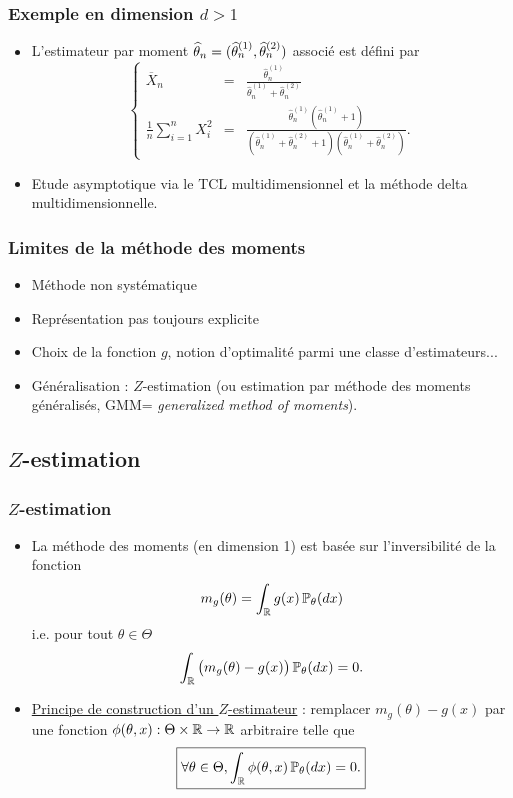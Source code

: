\begin{frame}
\frametitle{Exemple en dimension $d>1$}
\begin{itemize}
\item \alert{L'estimateur par moment} $\operatorname{\widehat \theta_{\mathnormal{n}}} = (\widehat \theta_n^{(1)},\widehat \theta_n^{(2)})$ associé est défini par
$$
\left\{\begin{array}{cll}
\overline{X}_n & = &\displaystyle \frac{\widehat \theta_n^{(1)}}{\widehat \theta_n^{(1)}+\widehat \theta_n^{(2)}} \\
\frac{1}{n}\sum_{i = 1}^n X_i^2 & = &\displaystyle  \frac{\widehat \theta_n^{(1)}(\widehat \theta_n^{(1)}+1)}{(\widehat \theta_n^{(1)}+\widehat \theta_n^{(2)}+1)(\widehat \theta_n^{(1)}+\widehat \theta_n^{(2)})}.
\end{array}
\right.
$$
\item \alert{Etude asymptotique} via le TCL multidimensionnel et la méthode  delta multidimensionnelle.
\end{itemize}
\end{frame}

\begin{frame}
\frametitle{Limites de la méthode des moments}
\begin{itemize}
\item Méthode \alert{non systématique}
\item Représentation pas toujours explicite
\item Choix de la fonction $g$, notion d'optimalité parmi une classe d'estimateurs...
\item \alert{Généralisation} : $Z$-estimation (ou estimation par méthode
des moments généralisés, GMM= {\it generalized method of moments}).
\end{itemize}
\end{frame}
\subsection{$Z$-estimation}
\begin{frame}
\frametitle{$Z$-estimation}
\begin{itemize}
\item La méthode des moments  (en dimension 1) est basée sur l'inversibilité de la fonction
$$m_g(\theta) = \int_{\operatorname{{\mathbb R}}} g(x)\operatorname{{\mathbb P}}_\theta(dx)$$
i.e. pour tout $\theta \in \Theta$
$$\int_{\operatorname{{\mathbb R}}}\big(m_g(\theta)-g(x)\big)\operatorname{{\mathbb P}}_\theta(dx)=0.$$
\item \underline{Principe de construction d'un $Z$-estimateur} :
\alert{ remplacer} $m_g(\theta)-g(x)$ par une fonction $\phi(\theta,x):
\Theta \times \operatorname{{\mathbb R}} \rightarrow \operatorname{{\mathbb R}}$ \alert{arbitraire}
telle que
$$\boxed{\forall \theta \in \Theta,\int_{\operatorname{{\mathbb R}}}\phi(\theta, x) \operatorname{{\mathbb P}}_\theta(dx)=0.}$$
\end{itemize}
\end{frame}

